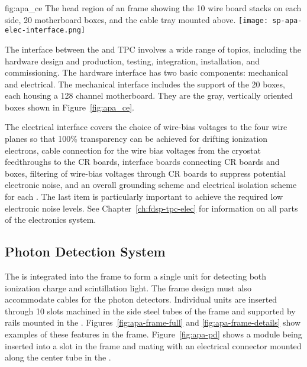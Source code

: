\begin{dunefigure}{fig:apa_ce}
{The head region of an  frame showing the 10 wire board stacks on each side, \num{20}  motherboard boxes, and the cable tray mounted above.}
\texttt{[image: sp-apa-elec-interface.png]}
\end{dunefigure}

The interface between the  and TPC  involves a wide range of topics, including the hardware design and production, testing, integration, installation, and commissioning. The hardware interface has two basic components: mechanical and electrical. The mechanical interface includes the support of the \num{20}  boxes, each housing a \num{128} channel  motherboard.  They are the gray, vertically oriented boxes shown in Figure~\ref{fig:apa_ce}. 

The electrical interface covers the choice of wire-bias voltages to the four wire planes so that \num{100}\% transparency can be achieved for drifting ionization electrons, cable connection for the wire bias voltages from the cryostat feedthroughs to the CR boards, interface boards connecting CR boards and  boxes, filtering of wire-bias voltages through CR boards to suppress potential electronic noise, and an overall grounding scheme and electrical isolation scheme for each . The last item is particularly important to achieve the required low electronic noise levels.  See Chapter~\ref{ch:fdsp-tpc-elec} for information on all parts of the  electronics system.


\subsection{Photon Detection System}
\label{sec:fdsp-apa-intfc-pds}

The  is integrated into the  frame to form a single unit for detecting both ionization charge and scintillation light.  The  frame design must also accommodate cables for the photon detectors.  %
Individual  units are inserted through \num{10} slots machined in the side steel tubes of the frame and supported by rails mounted in the . Figures~\ref{fig:apa-frame-full} and \ref{fig:apa-frame-details} show examples of these features in the frame. Figure~\ref{fig:apa-pd} shows a  module being inserted into a slot in the frame and mating with an electrical connector mounted along the center tube in the .

